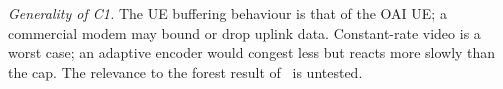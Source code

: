 \textit{Generality of C1.} The UE buffering behaviour is that of the OAI UE; a
commercial modem may bound or drop uplink data. Constant-rate video is a worst
case; an adaptive encoder would congest less but reacts more slowly than the
cap. The relevance to the forest result of~\cite{makhubela2026satnac} is
untested.
